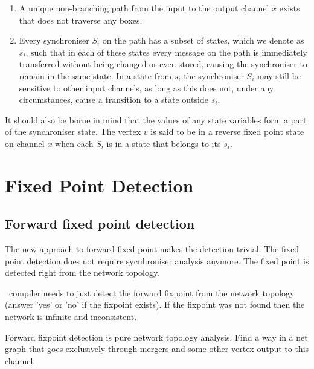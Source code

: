 \begin{enumerate}
\item A unique non-branching path from the input to the output channel $x$ exists that does not traverse any boxes.

\item Every synchroniser $S_i$ on the path has a subset of states, which we denote as $s_i$, such that in each of these states every message on the path is immediately transferred without being changed or even stored, causing the synchroniser to remain in the same state. In a state from $s_i$ the synchroniser $S_i$ may still be sensitive to other input channels, as long as this does not, under any circumstances, cause a transition to a state outside $s_i$.
\end{enumerate}

It should also be borne in mind that the values of any state variables form a part of the synchroniser state.
The vertex $v$ is said to be in a reverse fixed point state on channel $x$ when each $S_i$ is in a state that belongs to its $s_i$.


    \section{Fixed Point Detection\label{fp_detect}}

    \subsection{Forward fixed point detection\label{ffp_detect}}
The new approach to forward fixed point makes the detection trivial. The fixed point detection does not require sycnhroniser analysis anymore. The fixed point is detected right from the network topology.

\ak\ compiler needs to just detect the forward fixpoint from the network topology (answer 'yes' or 'no' if the fixpoint exists). If the fixpoint was not found then the network is infinite and inconsistent.

Forward fixpoint detection is pure network topology analysis. Find a way in a net graph that goes exclusively through mergers and some other vertex output to this channel.

